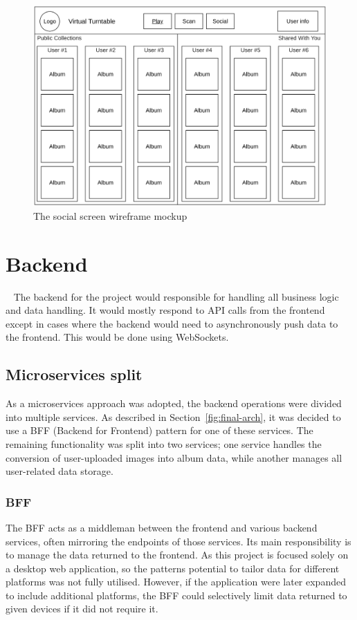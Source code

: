 
\begin{figure} [H]
    \centering
    \includegraphics[width=0.6\linewidth]{figures/social_screen_mockup.png}
    \caption{The social screen wireframe mockup}
    \label{fig:social_screen_mockup}
\end{figure}

\section{Backend}~\label{sec:backend-design}
The backend for the project would responsible for handling all business logic and data handling. It would mostly respond to API calls from the frontend except in cases where the backend would need to asynchronously push data to the frontend. This would be done using WebSockets.

\subsection{Microservices split}
As a microservices approach was adopted, the backend operations were divided into multiple services. As described in Section~\ref{fig:final-arch}, it was decided to use a BFF (Backend for Frontend) pattern for one of these services. The remaining functionality was split into two services; one service handles the conversion of user-uploaded images into album data, while another manages all user-related data storage.

\subsubsection{BFF}
The BFF acts as a middleman between the frontend and various backend services, often mirroring the endpoints of those services. Its main responsibility is to manage the data returned to the frontend. As this project is focused solely on a desktop web application, so the patterns potential to tailor data for different platforms was not fully utilised. However, if the application were later expanded to include additional platforms, the BFF could selectively limit data returned to given devices if it did not require it.

